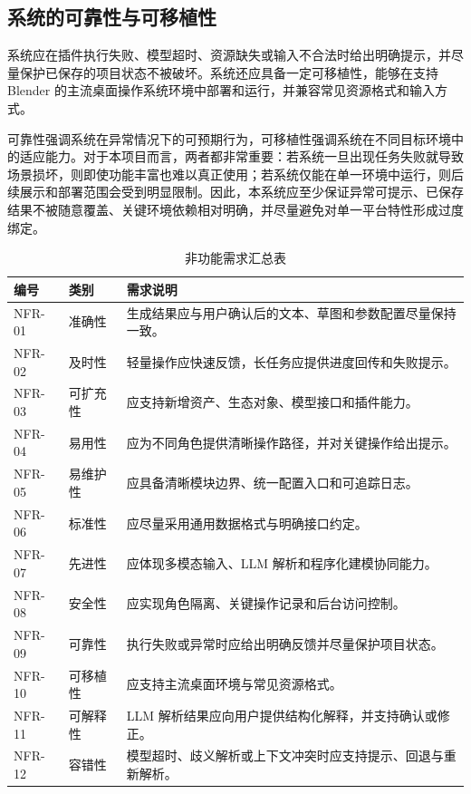 \documentclass[UTF8,a4paper,10pt]{ctexart}
\begin{document}
\subsection{系统的可靠性与可移植性}
系统应在插件执行失败、模型超时、资源缺失或输入不合法时给出明确提示，并尽量保护已保存的项目状态不被破坏。系统还应具备一定可移植性，能够在支持 Blender 的主流桌面操作系统环境中部署和运行，并兼容常见资源格式和输入方式。

可靠性强调系统在异常情况下的可预期行为，可移植性强调系统在不同目标环境中的适应能力。对于本项目而言，两者都非常重要：若系统一旦出现任务失败就导致场景损坏，则即使功能丰富也难以真正使用；若系统仅能在单一环境中运行，则后续展示和部署范围会受到明显限制。因此，本系统应至少保证异常可提示、已保存结果不被随意覆盖、关键环境依赖相对明确，并尽量避免对单一平台特性形成过度绑定。
{
\renewcommand{\arraystretch}{1.3}
\begin{table}[H]
\centering
\caption{非功能需求汇总表}
\begin{tabularx}{\textwidth}{p{1.8cm} p{2.6cm} Y}
\toprule
{}
编号 & 类别 & 需求说明 \\
\midrule
NFR-01 & 准确性 & 生成结果应与用户确认后的文本、草图和参数配置尽量保持一致。 \\
NFR-02 & 及时性 & 轻量操作应快速反馈，长任务应提供进度回传和失败提示。 \\
NFR-03 & 可扩充性 & 应支持新增资产、生态对象、模型接口和插件能力。 \\
NFR-04 & 易用性 & 应为不同角色提供清晰操作路径，并对关键操作给出提示。 \\
NFR-05 & 易维护性 & 应具备清晰模块边界、统一配置入口和可追踪日志。 \\
NFR-06 & 标准性 & 应尽量采用通用数据格式与明确接口约定。 \\
NFR-07 & 先进性 & 应体现多模态输入、LLM 解析和程序化建模协同能力。 \\
NFR-08 & 安全性 & 应实现角色隔离、关键操作记录和后台访问控制。 \\
NFR-09 & 可靠性 & 执行失败或异常时应给出明确反馈并尽量保护项目状态。 \\
NFR-10 & 可移植性 & 应支持主流桌面环境与常见资源格式。 \\
NFR-11 & 可解释性 & LLM 解析结果应向用户提供结构化解释，并支持确认或修正。 \\
NFR-12 & 容错性 & 模型超时、歧义解析或上下文冲突时应支持提示、回退与重新解析。 \\
\bottomrule
\end{tabularx}
\end{table}
}
\end{document}
